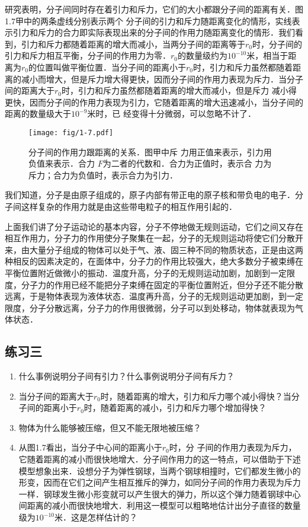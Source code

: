 研究表明，分子间同时存在着引力和斥力，它们的大小都跟分子间的距离有关．图1.7甲中的两条虚线分别表示两个
分子间的引力和斥力随距离变化的情形，实线表示引力和斥力的合力即实际表现出来的分子间的作用力随距离变化的情形．我们看到，引力和斥力都随着距离的增大而减小，当两分子间的距离等于$r_0$时，分子间的引力和斥力相互平衡，分子间的作用力为零．$r_0$的数量级约为$10^{-10}$米，相当于距离为$r_0$的位置叫做平衡位置．当分子间的距离小于$r_0$时，引力和斥力虽然都随着距离的减小而增大，但是斥力增大得更快，因而分子间的作用力表现为斥力．当分子间的距离大于$r_0$时，引力和斥力虽然都随着距离的增大而减小，但是斥力
减小得更快，因而分子间的作用力表现为引力，它随着距离的增大迅速减小，当分子间的距离的数量级大于$10^{-9}$米时，已
经变得十分微弱，可以忽略不计了．
\begin{figure}[htp]\centering
	\texttt{[image: fig/1-7.pdf]}
	\caption{分子间的作用力跟距离的关系．图甲中斥
力用正值来表示，引力用负值来表示．合力
$F$为二者的代数和．合力为正值时，表示合
力为斥力；合力为负值时，表示合力为引力．
}
\end{figure}

我们知道，分子是由原子组成的，原子内部有带正电的原子核和带负电的电子．分子间这样复杂的作用力就是由这些带电粒子的相互作用引起的．

上面我们讲了分子运动论的基本内容，分子不停地做无规则运动，它们之间又存在相互作用力，分子力的作用使分子聚集在一起，分子的无规则运动将使它们分散开来，由大量分子组成的物体可以处于气、液、固三种不同的物质状态，正是由这两种相反的因素决定的，在面体中，分子力的作用比较强大，绝大多数分子被束缚在平衡位置附近做微小的振动．温度升高，分子的无规则运动加剧，加剧到一定限度，分子力的作用已经不能把分子束缚在固定的平衡位置附近，但分子还不能分散远离，于是物体表现为液体状态．温度再升高，分子的无规则运动更加剧，到一定限度，分子分散远离，分子力的作用很微弱，分子可以到处移动，物体就表现为气体状态．

\subsection*{练习三}
\begin{enumerate}
	\item 什么事例说明分子间有引力？什么事例说明分子间有斥力？
	\item 当分子间的距离大于$r_0$时，随着距离的增大，引力和斥力哪个减小得快？当分子间的距离小于$r_0$时，随着距离的减小，引力和斥力哪个增加得快？
	\item 物体为什么能够被压缩，但又不能无限地被压缩？
\item	从图1.7看出，当分子中心间的距离小于$r_0$时，分
子间的作用力表现为斥力，它随着距离的减小而很快地增大．分子间作用力的这一特点，可以借助于下述模型想象出来．设想分子为弹性钢球，当两个钢球相撞时，它们都发生微小的形变，因而在它们之间产生相互推斥的弹力，如同分子间的作用力表现为斥力一样．钢球发生微小形变就可以产生很大的弹力，所以这个弹力随着钢球中心间距离的减小而很快地增大．利用这一模型可以粗略地估计出分子直径的数量级为$10^{-10}$米．这是怎样估计的？

\end{enumerate}

